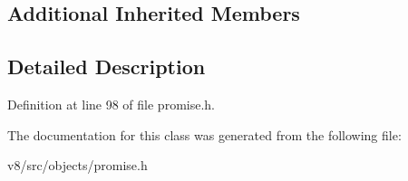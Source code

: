 \subsection*{Additional Inherited Members}


\subsection{Detailed Description}


Definition at line 98 of file promise.\+h.



The documentation for this class was generated from the following file\+:\begin{DoxyCompactItemize}
\item 
v8/src/objects/promise.\+h\end{DoxyCompactItemize}

